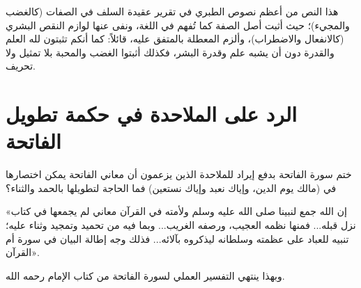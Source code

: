 \begin{fawaid}
هذا النص من أعظم نصوص الطبري في تقرير عقيدة السلف في الصفات (كالغضب والمجيء)؛ حيث أثبت أصل الصفة كما تُفهم في اللغة، ونفى عنها لوازم النقص البشري (كالانفعال والاضطراب)، وألزم المعطلة بالمتفق عليه، قائلاً: كما أنكم تثبتون لله العلم والقدرة دون أن يشبه علم وقدرة البشر، فكذلك أثبتوا الغضب والمحبة بلا تمثيل ولا تحريف.
\end{fawaid}

\separator

\section{الرد على الملاحدة في حكمة تطويل الفاتحة}
ختم  سورة الفاتحة بدفع إيراد للملاحدة الذين يزعمون أن معاني الفاتحة يمكن اختصارها في (مالك يوم الدين، وإياك نعبد وإياك نستعين) فما الحاجة لتطويلها بالحمد والثناء؟

 «إن الله جمع لنبينا صلى الله عليه وسلم ولأمته في القرآن معاني لم يجمعها في كتاب نزل قبله... فمنها نظمه العجيب، ورصفه الغريب... وبما فيه من تحميد وتمجيد وثناء عليه؛ تنبيه للعباد على عظمته وسلطانه ليذكروه بآلائه... فذلك وجه إطالة البيان في سورة أم القرآن».

وبهذا ينتهي التفسير العملي لسورة الفاتحة من كتاب الإمام  رحمه الله.

